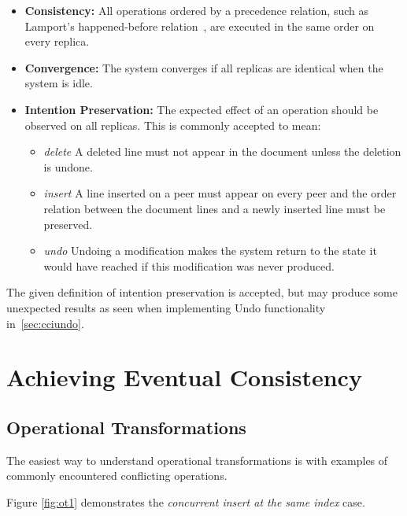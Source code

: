 \documentclass[12pt,a4paper,twoside,openright]{report}
\begin{document}
	\begin{itemize}
		\item \textbf{Consistency:} All operations ordered by a precedence relation, such as Lamport’s happened-before relation~\cite{lamport1978}, are executed in the same order on every replica.
	
		\item \textbf{Convergence:} The system converges if all replicas are identical when the system is idle.
		
		\item \textbf{Intention Preservation:} The expected effect of an operation should be observed on all replicas. This is commonly accepted to mean:

			\begin{itemize}
				\item \textit{delete}  A deleted line must not appear in the document unless the deletion is undone.
				
				\item \textit{insert}  A line inserted on a peer must appear on every peer and the order relation between the document lines and a newly inserted line must be preserved.
				
				\item  \textit{undo}  Undoing a modification makes the system return to the state it would have reached if this modification was never produced.
				
			\end{itemize}	
		
	\end{itemize}
	
	The given definition of intention preservation is accepted, but may produce some unexpected results as seen when implementing Undo functionality in~\cref{sec:cciundo}.
	

\section{Achieving Eventual Consistency}

	\subsection{Operational Transformations}
	
	The easiest way to understand operational transformations is with examples of commonly encountered conflicting operations.
	
	Figure \ref{fig:ot1} demonstrates the \textit{concurrent insert at the same index} case.
	
\end{document}
